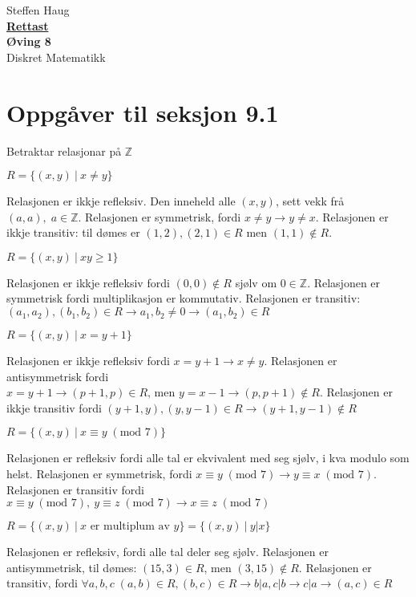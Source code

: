 \documentclass[a4paper, 11pt]{article}
\newcommand{\Themecolor}{Mahogany} %
\newcommand{\Themetext}[1]{\textcolor{\Themecolor}{#1}}
\newcommand{\Task}[1]{\vspace{3mm}\noindent {\tt \Themetext{#1:}}}
\newcommand{\MajorTask}[1]{
  \vspace{5mm}
  \reversemarginpar
  \marginnote{\large\bfseries \Themetext{#1}}
}
\newcommand{\Z}{\mathbb{Z}}
\newcommand{\Modulo}[1]{\;(\text{mod }#1)}
\begin{document}
{
  \raggedleft
  {\Large Steffen Haug} \\
  {\large \bfseries \underline{Rettast}}\\[0.167\textheight]
  {\HUGE \bfseries \Themetext{Øving 8}} \\[\baselineskip]
  {\LARGE Diskret Matematikk}

}
\thispagestyle{empty}
\pagestyle{empty}
\newpage

\section*{Oppgåver til seksjon 9.1} %
\MajorTask{7}
\noindent Betraktar relasjonar på \(\Z\)

\Task{a} \(R = \{(x, y) \:|\: x \neq y\}\)

\noindent Relasjonen er ikkje refleksiv. Den inneheld alle \((x,y)\), sett vekk frå
\((a,a), \; a\in\Z\). Relasjonen er symmetrisk, fordi \(x \neq y \rightarrow y \neq x\).
Relasjonen er ikkje transitiv: til dømes er \((1,2), (2,1) \in R\) men \((1,1) \not\in R\).

\Task{b} \(R = \{(x,y) \:|\: xy \geq 1\}\)

\noindent Relasjonen er ikkje refleksiv fordi \((0,0)\not\in R\) sjølv om \(0 \in \Z\).
Relasjonen er symmetrisk fordi multiplikasjon er kommutativ. Relasjonen er transitiv:
\((a_1,a_2), (b_1,b_2) \in R \rightarrow a_1,b_2 \neq 0 \rightarrow (a_1, b_2) \in R\)

\Task{c} \(R = \{(x,y) \:|\: x = y + 1\}\)

\noindent Relasjonen er ikkje refleksiv fordi \(x = y + 1 \rightarrow x \neq y\). Relasjonen
er antisymmetrisk fordi \(x = y + 1 \rightarrow (p+1, p) \in R \text{, men } y = x - 1
\rightarrow (p, p+1) \not\in R\). Relasjonen er ikkje transitiv fordi
\((y+1, y), (y, y-1) \in R \rightarrow (y+1, y-1) \not\in R\)


\Task{d} \(R = \{(x,y) \:|\: x  \equiv y \Modulo{7}\}\)

\noindent Relasjonen er refleksiv fordi alle tal er ekvivalent med seg sjølv, i kva
modulo som helst. Relasjonen er symmetrisk, fordi \(x \equiv y \Modulo{7} \rightarrow
y \equiv x \Modulo{7}\). Relasjonen er transitiv fordi \(x \equiv y \Modulo{7},\:
y \equiv z \Modulo{7} \rightarrow x \equiv z \Modulo{7}\)

\Task{e} \(R = \{(x,y) \:|\: x \text{ er multiplum av } y\} = \{(x,y) \:|\: y | x\}\)

\noindent Relasjonen er refleksiv, fordi alle tal deler seg sjølv. Relasjonen er antisymmetrisk,
til dømes: \((15, 3) \in R\), men \((3, 15) \not\in R\). Relasjonen er transitiv, fordi
\(\forall a,b,c \; (a,b) \in R, (b,c) \in R \rightarrow b|a, c|b \rightarrow c|a \rightarrow
(a,c) \in R\)
\end{document}
